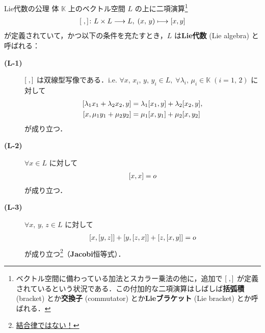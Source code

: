 \documentclass[rep_main]{subfiles}
\begin{document}
\begin{myaxiom}[label=ax:LieAlg, breakable]{Lie代数の公理}
    体 $\mathbb{K}$ 上のベクトル空間 $L$ の上に二項演算\footnote{ベクトル空間に備わっている加法とスカラー乗法の他に，追加で $\comm{\;}{\,}$ が定義されているという状況である．この付加的な二項演算はしばしば\textbf{括弧積} (bracket) とか\textbf{交換子} (commutator) とか\textbf{Lieブラケット} (Lie bracket) とか呼ばれる．}
    \begin{align}
        \comm{\;}{\,} \colon L \times L \lto L,\; (x,\, y) \lmto \comm{x}{y}
    \end{align}
    が定義されていて，かつ以下の条件を充たすとき，$L$ は\textbf{Lie代数} (Lie algebra) と呼ばれる：
    \begin{description}
        \item[\textbf{(L-1)}] $\comm{\;}{\,}$ は双線型写像である．i.e. $\forall x,\, x_i,\, y,\, y_i \in L,\; \forall \lambda_i,\, \mu_i \in \mathbb{K}\; (i = 1,\, 2)$ に対して
        \begin{align}
            \comm{\lambda_1 x_1 + \lambda_2 x_2}{y} &= \lambda_1 \comm{x_1}{y} + \lambda_2 \comm{x_2}{y}, \\
            \comm{x}{\mu_1 y_1 + \mu_2 y_2} &= \mu_1 \comm{x}{y_1} + \mu_2 \comm{x}{y_2}
        \end{align}
        が成り立つ．
        \item[\textbf{(L-2)}] $\forall x \in L$ に対して
        \begin{align}
            \comm{x}{x} = o
        \end{align}
        が成り立つ．
        \item[\textbf{(L-3)}] $\forall x,\, y,\, z \in L$ に対して
        \begin{align}
            \label{eq:Jacobi-identity}
            \comm{x}{\comm{y}{z}} + \comm{y}{\comm{z}{x}} + \comm{z}{\comm{x}{y}} = o
        \end{align}
        が成り立つ\footnote{\underline{結合律ではない！}}（\textbf{Jacobi}恒等式）．
    \end{description}
    
\end{myaxiom}
\end{document}
